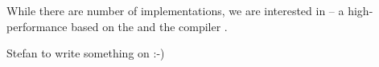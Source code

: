 
While there are number of \Newspeak{} implementations, we are interested in \SOMns{} -- a high-performance \vm{} based on the \Truffle{} and the \Graal{} compiler .

Stefan to write something on \SOMns{} :-)